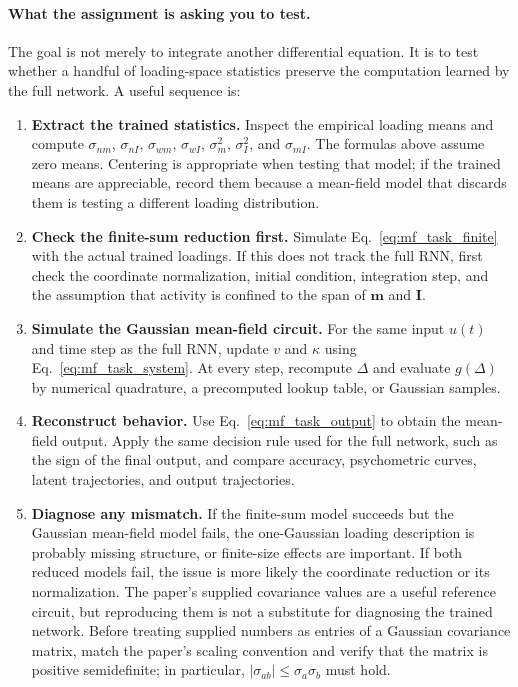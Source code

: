 \documentclass[11pt]{article}
\newcommand{\vm}{\mathbf{m}}
\newcommand{\vI}{\mathbf{I}}
\begin{document}
\paragraph{What the assignment is asking you to test.}
The goal is not merely to integrate another differential equation. It is to test
whether a handful of loading-space statistics preserve the computation learned
by the full network. A useful sequence is:
\begin{enumerate}
  \item \textbf{Extract the trained statistics.} Inspect the empirical loading
  means and compute $\sigma_{nm}$, $\sigma_{nI}$, $\sigma_{wm}$,
  $\sigma_{wI}$, $\sigma_m^2$, $\sigma_I^2$, and $\sigma_{mI}$. The formulas
  above assume zero means. Centering is appropriate when testing that model; if
  the trained means are appreciable, record them because a mean-field model that
  discards them is testing a different loading distribution.

  \item \textbf{Check the finite-sum reduction first.} Simulate
  Eq.~\eqref{eq:mf_task_finite} with the actual trained loadings. If this does
  not track the full RNN, first check the coordinate normalization, initial
  condition, integration step, and the assumption that activity is confined to
  the span of $\vm$ and $\vI$.

  \item \textbf{Simulate the Gaussian mean-field circuit.} For the same input
  $u(t)$ and time step as the full RNN, update $v$ and $\kappa$ using
  Eq.~\eqref{eq:mf_task_system}. At every step, recompute $\Delta$ and evaluate
  $g(\Delta)$ by numerical quadrature, a precomputed lookup table, or Gaussian
  samples.

  \item \textbf{Reconstruct behavior.} Use Eq.~\eqref{eq:mf_task_output} to
  obtain the mean-field output. Apply the same decision rule used for the full
  network, such as the sign of the final output, and compare accuracy,
  psychometric curves, latent trajectories, and output trajectories.

  \item \textbf{Diagnose any mismatch.} If the finite-sum model succeeds but
  the Gaussian mean-field model fails, the one-Gaussian loading description is
  probably missing structure, or finite-size effects are important. If both
  reduced models fail, the issue is more likely the coordinate reduction or its
  normalization. The paper's supplied covariance values are a useful reference
  circuit, but reproducing them is not a substitute for diagnosing the trained
  network. Before treating supplied numbers as entries of a Gaussian covariance
  matrix, match the paper's scaling convention and verify that the matrix is
  positive semidefinite; in particular,
  $|\sigma_{ab}|\leq\sigma_a\sigma_b$ must hold.
\end{enumerate}
\end{document}

